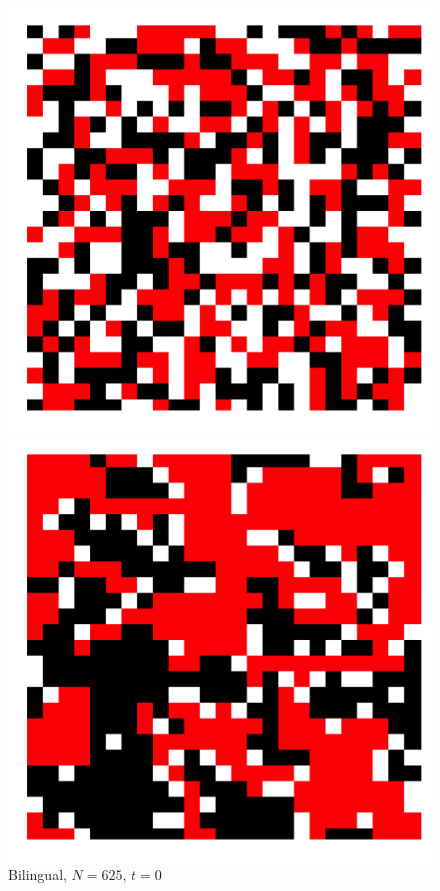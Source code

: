 \begin{figure}[h]
\centering
\begin{minipage}[t]{0.4\linewidth}
    \centering
    \includegraphics[width=\textwidth]{images/task1/smallw_bi_t=1.png} 
    \caption{\scriptsize Bilingual, \(N=625\), \(t=0\)}
    \label{reg_net_bi1}
\end{minipage}
\hfill
\begin{minipage}[t]{0.4\linewidth}
    \centering
    \includegraphics[width=\textwidth]{images/task1/smallw_bi_t=5000.png} 

\end{minipage}
\end{figure}
